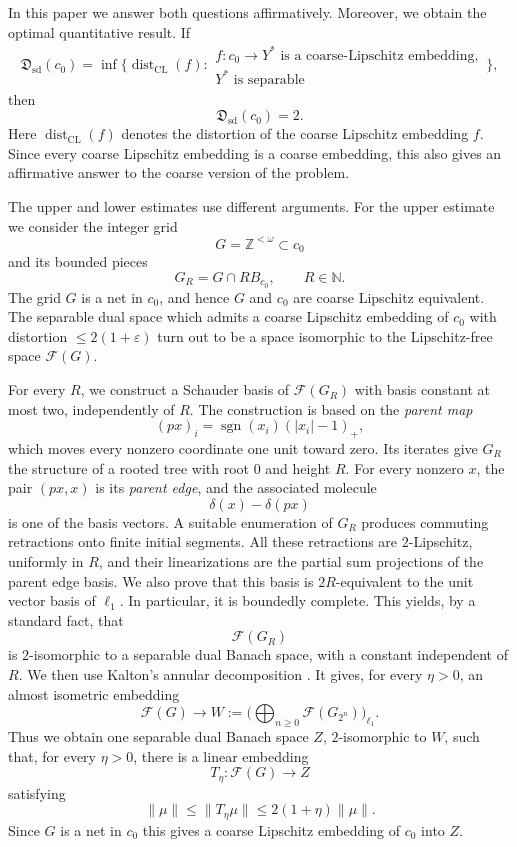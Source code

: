 \documentclass[11pt]{amsart}
\theoremstyle{definition}
\newcommand{\F}{\mathcal F}
\begin{document}
 In this paper we answer both questions affirmatively. Moreover, we obtain the optimal quantitative result. If \[ \mathfrak D_{\mathrm{sd}}(c_0) = \inf\Big\{ \operatorname{dist}_{\mathrm{CL}}(f): \begin{array}{c} f:c_0\longrightarrow Y^*\text{ is a coarse-Lipschitz embedding},\\ Y^*\text{ is separable} \end{array} \Big\}, \] then \[ \mathfrak D_{\mathrm{sd}}(c_0)=2. \] Here $\operatorname{dist}_{\mathrm{CL}}(f)$ denotes the distortion of the coarse Lipschitz embedding $f$. 
 Since every coarse Lipschitz embedding is a coarse embedding, this also gives an affirmative answer to the coarse version of the problem. 
 
 The upper and lower estimates use different arguments. For the upper estimate we consider the integer grid \[ G=\mathbb Z^{<\omega}\subset c_0 \] and its bounded pieces \[ G_R=G\cap R B_{c_0}, \qquad R\in\mathbb N. \]
  The grid $G$ is a net in $c_0$, and hence $G$ and $c_0$ are coarse Lipschitz equivalent. The separable dual space which admits a coarse Lipschitz embedding of $c_0$ with distortion $\le 2(1+\varepsilon)$ turn out to be a space isomorphic to the Lipschitz-free space $\F(G)$. 
 
 For every $R$, we construct a Schauder basis of $\F(G_R)$ with basis constant at most two, independently of $R$. The construction is based on the {\em parent map} \[ (px)_i=\operatorname{sgn}(x_i)(|x_i|-1)_+, \] which moves every nonzero coordinate one unit toward zero. Its iterates give $G_R$ the structure of a rooted tree with root $0$ and height $R$. For every nonzero $x$, the pair $(px,x)$ is its {\em parent edge}, and the associated molecule \[ \delta(x)-\delta(px) \] is one of the basis vectors. A suitable enumeration of $G_R$ produces commuting retractions onto finite initial segments. All these retractions are $2$-Lipschitz, uniformly in $R$, and their linearizations are the partial sum projections of the parent edge basis. We also prove that this basis is $2R$-equivalent to the unit vector basis of $\ell_1$. In particular, it is boundedly complete. This yields, by a standard fact, that \[ \F(G_R) \] is $2$-isomorphic to a separable dual Banach space, with a constant independent of $R$. We then use Kalton's annular decomposition \cite{Kalton2004}. It gives, for every $\eta>0$, an almost isometric embedding \[ \F(G)\longrightarrow W:= \Big( \bigoplus_{n\geq0}\F(G_{2^n}) \Big)_{\ell_1}. \] Thus we obtain one separable dual Banach space $Z$, $2$-isomorphic to $W$, such that, for every $\eta>0$, there is a linear embedding \[ T_\eta:\F(G)\longrightarrow Z \] satisfying \[ \|\mu\| \leq \|T_\eta\mu\| \leq 2(1+\eta)\|\mu\|. \] Since $G$ is a net in $c_0$ this gives a coarse Lipschitz embedding of $c_0$ into $Z$. 
 
\end{document}
